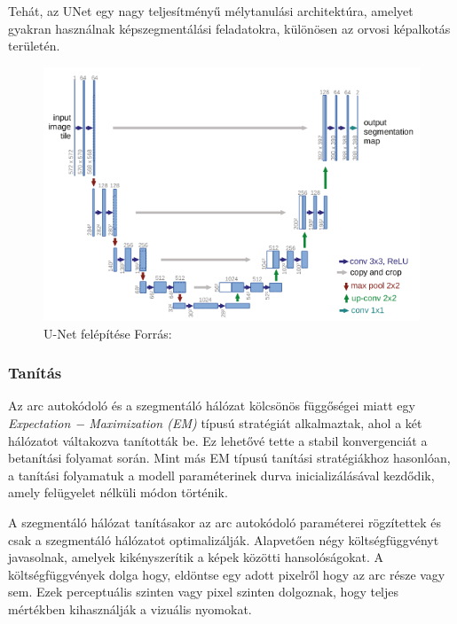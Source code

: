 \documentclass[12pt,a4]{article}
\begin{document}
                Tehát, az UNet egy nagy teljesítményű mélytanulási architektúra, amelyet gyakran használnak képszegmentálási feladatokra, különösen az orvosi képalkotás területén. 
        
                \begin{figure}[h]	
     	              \centering
     	        	\includegraphics[width=0.7\linewidth]{unet}
     	        	\caption{U-Net felépítése
     	        		Forrás: \cite{unet}}
                    \label{fig:unet}
     	        \end{figure}
              \clearpage
 	
            \subsubsection{Tanítás}
            
         	      Az arc autokódoló és a szegmentáló hálózat kölcsönös függőségei miatt 
                egy \textit{Expectation − Maximization (EM)} típusú stratégiát alkalmaztak,
         	      ahol a két hálózatot váltakozva tanították be. Ez lehetővé tette a stabil
         	      konvergenciát a betanítási folyamat során. Mint más EM típusú tanítási
         	      stratégiákhoz hasonlóan, a tanítási folyamatuk a modell paraméterinek
         	      durva inicializálásával kezdődik, amely felügyelet nélküli módon történik.
         	
         	      A szegmentáló hálózat tanításakor az arc autokódoló paraméterei
         	      rögzítettek és csak a szegmentáló hálózatot optimalizálják. Alapvetően 
                négy költségfüggvényt javasolnak, amelyek kikényszerítik a képek közötti hansolóságokat. A költségfüggvények dolga hogy, eldöntse egy adott pixelről hogy az arc része vagy sem. Ezek perceptuális szinten vagy pixel szinten dolgoznak, hogy teljes mértékben kihasználják a vizuális nyomokat.
         	
\end{document}
